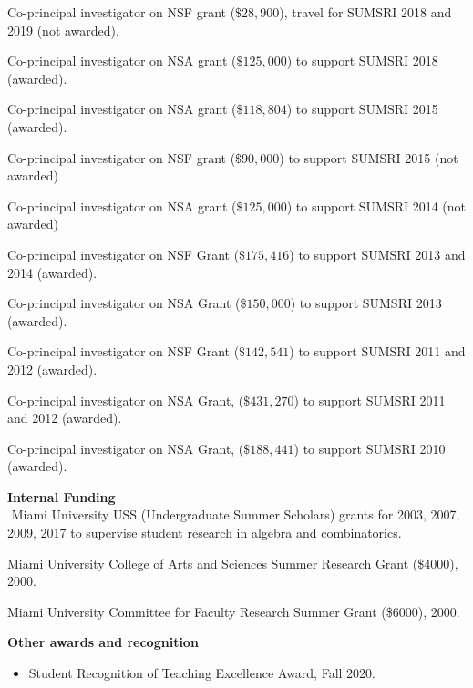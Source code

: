 \documentclass[overlapped,line,letterpaper]{res}
\begin{document}
\begin{resume}
Co-principal investigator on NSF grant ($\$28,900$), travel for SUMSRI 2018 and 2019 (not awarded).

Co-principal investigator on NSA grant ($\$125,000$) to support SUMSRI 2018 (awarded).

Co-principal investigator on NSA grant ($\$118,804$) to support SUMSRI 2015 (awarded).

Co-principal investigator on NSF grant ($\$90,000$) to support SUMSRI 2015 (not awarded)

Co-principal investigator on NSA grant ($\$125,000$) to support SUMSRI 2014 (not awarded)

Co-principal investigator on NSF Grant  ($\$175,416$) to support SUMSRI 2013 and 2014 (awarded).

Co-principal investigator on NSA Grant  ($\$150,000$) to support SUMSRI 2013 (awarded).

Co-principal investigator on NSF Grant ($\$142,541$) to support SUMSRI 2011 and 2012 (awarded).

Co-principal investigator on NSA Grant,  ($\$431,270$) to support SUMSRI 2011 and 2012 (awarded).

Co-principal investigator on NSA Grant,  ($\$188,441$) to support SUMSRI 2010 (awarded).




\newpage

{\bf Internal Funding}\\
$ $
Miami University USS (Undergraduate Summer Scholars) grants for 2003, 2007, 2009, 2017 to supervise student research in algebra and combinatorics.

Miami University College of Arts and Sciences Summer Research Grant (\$4000), 2000.

Miami University Committee for Faculty Research Summer Grant (\$6000), 2000.


{\bf Other awards and recognition}

\smallskip
\begin{itemize} 

\item
Student Recognition of Teaching Excellence Award, Fall 2020.


\end{itemize}
\end{resume}
\end{document}
